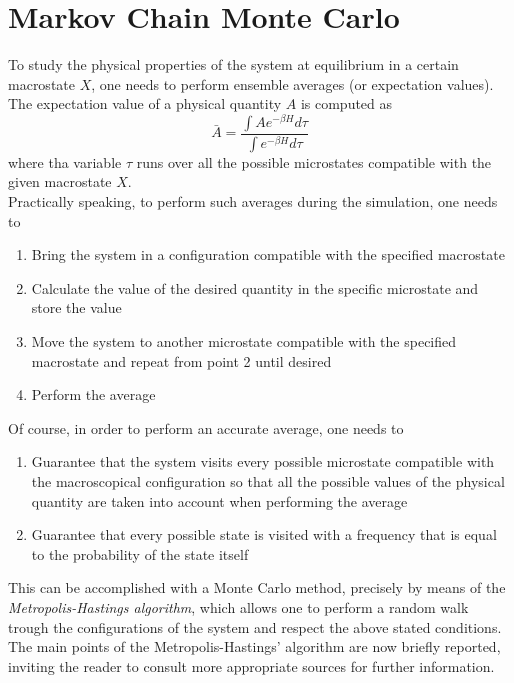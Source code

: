 \section{Markov Chain Monte Carlo}
\label{sec:MCMC}
To study the physical properties of the system at equilibrium in a certain macrostate $X$, one needs to perform ensemble averages (or expectation values). The expectation value of a physical quantity $A$ is computed as 
\begin{equation}
    \bar A = \frac{\int A e^{-\beta H} d\tau}{\int e^{-\beta H} d \tau}
    \label{eq:averageval}
\end{equation}
where tha variable $\tau$ runs over all the possible microstates compatible with the given macrostate $X$. \\
Practically speaking, to perform such averages during the simulation, one needs to
\begin{enumerate}
    \item Bring the system in a configuration compatible with the specified macrostate 
    \item Calculate the value of the desired quantity in the specific microstate and store the value
    \item Move the system to another microstate compatible with the specified macrostate and repeat from point 2 until desired
    \item Perform the average
\end{enumerate}
Of course, in order to perform an accurate average, one needs to 
\begin{enumerate}
    \item Guarantee that the system visits every possible microstate compatible with the macroscopical configuration so that all the possible values of the physical quantity are taken into account when performing the average
    \item Guarantee that every possible state is visited with a frequency that is equal to the probability of the state itself
\end{enumerate}
This can be accomplished with a Monte Carlo method, precisely by means of the \emph{Metropolis-Hastings algorithm}, which allows one to perform a random walk trough the configurations of the system and respect the above stated conditions. \\
The main points of the Metropolis-Hastings' \cite{Hastings} algorithm are now briefly reported, inviting the reader to consult more appropriate sources for further information. \par
